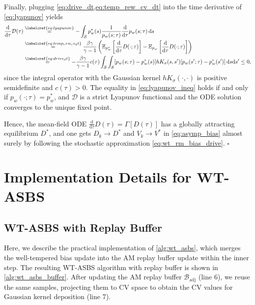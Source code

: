 \documentclass[]{fairmeta}
\theoremstyle{remark}
\begin{document}
Finally, plugging \cref{eq:drive_dt,eq:temp_rew_cv_dt} into the time derivative of \cref{eq:lyapunov} yields
\begin{align}
\frac{\mathrm{d}}{\mathrm{d}\tau} \mathcal{D}(\tau) & \stackrel{\labelcref{eq:lyapunov}}{=} - \int_\mathcal{S} p_w^\ast(s) \frac{1}{p_w(s; \tau)} \frac{\mathrm{d}}{\mathrm{d}\tau} p_w(s; \tau) \, \mathrm{d}s \\
& \stackrel{\labelcref{eq:temp_rew_cv_dt}}{=} \frac{\beta\gamma}{\gamma - 1} \left( \mathbb{E}_{p_w^\ast}\left[ \frac{\mathrm{d}}{\mathrm{d}\tau} D(\cdot; \tau)\right] - \mathbb{E}_{p_w}\left[ \frac{\mathrm{d}}{\mathrm{d}\tau} D(\cdot; \tau)\right]\right) \\
& \stackrel{\labelcref{eq:drive_dt}}{=} -\frac{\beta\gamma}{\gamma - 1}c(\tau)\int_{\mathcal{S}}\int_{\mathcal{S}} [p_w(s; \tau) - p_w^\ast(s)] hK_\sigma(s, s') [p_w(s'; \tau) - p_w^\ast(s')] \, \mathrm{d}s\mathrm{d}s' \le 0,
\label{eq:lyapunov_ineq}
\end{align}
since the integral operator with the Gaussian kernel $hK_\sigma(\cdot, \cdot)$ is positive semidefinite and $c(\tau) > 0$.
The equality in \cref{eq:lyapunov_ineq} holds if and only if $p_w(\cdot; \tau) = p_w^\ast$, and $\mathcal{D}$ is a strict Lyapunov functional and the ODE solution converges to the unique fixed point.

Hence, the mean-field ODE $\frac{\mathrm{d}}{\mathrm{d}\tau} D(\tau) = \Gamma[D(\tau)]$ has a globally attracting equilibrium $D^\ast$, and one gets $D_k \to D^\ast$ and $V_k \to V^\ast$ in \cref{eq:asymp_bias} almost surely by following the stochastic approximation \cref{eq:wt_rm_bias_drive}.
\hfill $\square$


\section{Implementation Details for WT-ASBS}
\label{sec:implementation_details}

\subsection{WT-ASBS with Replay Buffer}

Here, we describe the practical implementation of \cref{alg:wt_asbs}, which merges the well-tempered bias update into the AM replay buffer update within the inner step.
The resulting WT-ASBS algorithm with replay buffer is shown in \cref{alg:wt_asbs_buffer}.
After updating the AM replay buffer $\mathcal{B}_\text{adj}$ (line 6), we reuse the same samples, projecting them to CV space to obtain the CV values for Gaussian kernel deposition (line 7).
\end{document}

